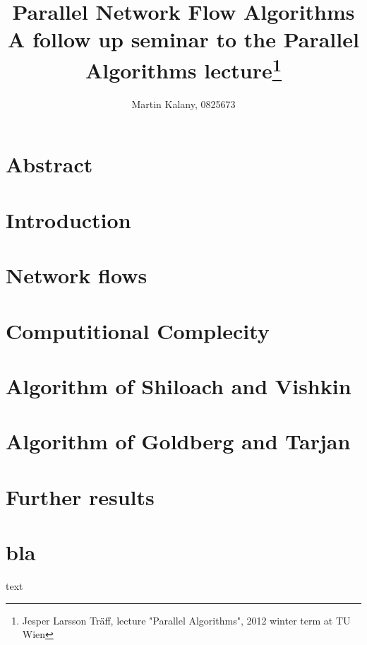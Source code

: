 \documentclass[a4paper,11pt, twocolumn]{article}
\title{Parallel Network Flow Algorithms \\ 
\large A follow up seminar to the Parallel Algorithms lecture\footnote{Jesper Larsson Träff, lecture "Parallel Algorithms", 2012 winter term at TU Wien}}
\author{Martin Kalany, 0825673}
\begin{document}
\maketitle

\section{Abstract}
\label{sec:abstract}

\section{Introduction}
\label{sec:intro}

\section{Network flows}
\label{sec:networkFlows}

\section{Computitional Complecity}
\label{sec:cc}

\section{Algorithm of Shiloach and Vishkin}
\label{sec:shiloach}

\section{Algorithm of Goldberg and Tarjan}
\label{sec:goldberg}

\section{Further results}
\label{sec:further}

\section{bla}
text \cite{ahuja93} \cite{papa95} \cite{yossi81} \cite{vishkin92} \cite{goldberg89} \cite{goldberg91} \cite{goldberg98} \cite{johnson87} \cite{schieber89} \cite{cherivan89} 

\printbibliography
\end{document}
